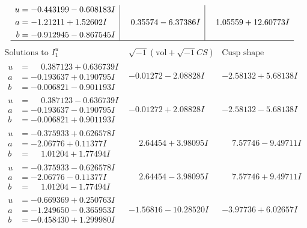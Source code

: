 \documentclass[1p]{elsarticle_modified}
\theoremstyle{definition}
\newcommand{\I}{\sqrt{-1}}
\begin{document}
$$\begin{array}{c|c|c}
\begin{aligned}
u &= -0.443199 - 0.608183 I \\
a &= -1.21211 + 1.52602 I \\
b &= -0.912945 - 0.867545 I\end{aligned}
 & \phantom{-}0.35574 - 6.37386 I & \phantom{-}1.05559 + 12.60773 I\\
 \hline 
 \end{array}$$\newpage$$\begin{array}{c|c|c}  
\text{Solutions to }I^u_{1}& \I (\text{vol} + \sqrt{-1}CS) & \text{Cusp shape}\\
 \hline 
\begin{aligned}
u &= \phantom{-}0.387123 + 0.636739 I \\
a &= -0.193637 + 0.190795 I \\
b &= -0.006821 - 0.901193 I\end{aligned}
 & -0.01272 - 2.08828 I & -2.58132 + 5.68138 I \\ \hline\begin{aligned}
u &= \phantom{-}0.387123 - 0.636739 I \\
a &= -0.193637 - 0.190795 I \\
b &= -0.006821 + 0.901193 I\end{aligned}
 & -0.01272 + 2.08828 I & -2.58132 - 5.68138 I \\ \hline\begin{aligned}
u &= -0.375933 + 0.626578 I \\
a &= -2.06776 + 0.11377 I \\
b &= \phantom{-}1.01204 + 1.77494 I\end{aligned}
 & \phantom{-}2.64454 + 3.98095 I & \phantom{-}7.57746 - 9.49711 I \\ \hline\begin{aligned}
u &= -0.375933 - 0.626578 I \\
a &= -2.06776 - 0.11377 I \\
b &= \phantom{-}1.01204 - 1.77494 I\end{aligned}
 & \phantom{-}2.64454 - 3.98095 I & \phantom{-}7.57746 + 9.49711 I \\ \hline\begin{aligned}
u &= -0.669369 + 0.250763 I \\
a &= -1.249650 - 0.365953 I \\
b &= -0.458430 + 1.299980 I\end{aligned}
 & -1.56816 - 10.28520 I & -3.97736 + 6.02657 I \\ \hline\begin{aligned}

\end{aligned}
\end{array}$$
\end{document}
